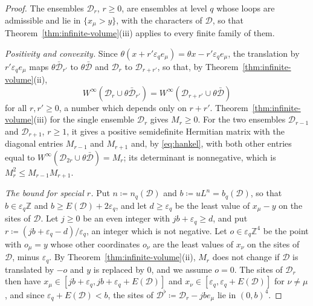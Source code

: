 \documentclass[11pt]{preprint}
\numberwithin{equation}{section}
\theoremstyle{definition}
\theoremstyle{remark}
\theoremstyle{plain}
\begin{document}
\begin{proof}
The ensembles $\mathcal D_r$, $r \geq 0$, are ensembles at level $q$ whose loops are admissible and lie in $\{ x_\mu > y \}$, with the characters of $\mathcal D$, so that Theorem~\ref{thm:infinite-volume}(iii) applies to every finite family of them.

\emph{Positivity and convexity.} Since $\theta(x + r'\varepsilon_qe_\mu) = \theta x - r'\varepsilon_qe_\mu$, the translation by $r'\varepsilon_qe_\mu$ maps $\theta\bar{\mathcal D}_{r'}$ to $\theta\bar{\mathcal D}$ and $\mathcal D_r$ to $\mathcal D_{r+r'}$, so that, by Theorem~\ref{thm:infinite-volume}(ii),
\begin{equation}\label{eq:hankel}
    W^\infty(\mathcal D_r \cup \theta\bar{\mathcal D}_{r'}) = W^\infty(\mathcal D_{r+r'} \cup \theta\bar{\mathcal D})
\end{equation}
for all $r, r' \geq 0$, a number which depends only on $r + r'$. Theorem~\ref{thm:infinite-volume}(iii) for the single ensemble $\mathcal D_r$ gives $M_r \geq 0$. For the two ensembles $\mathcal D_{r-1}$ and $\mathcal D_{r+1}$, $r \geq 1$, it gives a positive semidefinite Hermitian matrix with the diagonal entries $M_{r-1}$ and $M_{r+1}$ and, by \eqref{eq:hankel}, with both other entries equal to $W^\infty(\mathcal D_{2r} \cup \theta\bar{\mathcal D}) = M_r$; its determinant is nonnegative, which is $M_r^2 \leq M_{r-1}M_{r+1}$.

\emph{The bound for special $r$.} Put $n \coloneqq n_q(\mathcal D)$ and $b \coloneqq uL^n = b_q(\mathcal D)$, so that $b \in \varepsilon_q\mathbb Z$ and $b \geq E(\mathcal D) + 2\varepsilon_q$, and let $d \geq \varepsilon_q$ be the least value of $x_\mu - y$ on the sites of $\mathcal D$. Let $j \geq 0$ be an even integer with $jb + \varepsilon_q \geq d$, and put $r \coloneqq (jb + \varepsilon_q - d)/\varepsilon_q$, an integer which is not negative. Let $o \in \varepsilon_q\mathbb Z^4$ be the point with $o_\mu = y$ whose other coordinates $o_\nu$ are the least values of $x_\nu$ on the sites of $\mathcal D$, minus $\varepsilon_q$. By Theorem~\ref{thm:infinite-volume}(ii), $M_r$ does not change if $\mathcal D$ is translated by $-o$ and $y$ is replaced by $0$, and we assume $o = 0$. The sites of $\mathcal D_r$ then have $x_\mu \in [jb + \varepsilon_q, jb + \varepsilon_q + E(\mathcal D)]$ and $x_\nu \in [\varepsilon_q, \varepsilon_q + E(\mathcal D)]$ for $\nu \neq \mu$, and since $\varepsilon_q + E(\mathcal D) < b$, the sites of $\mathcal D^\flat \coloneqq \mathcal D_r - jbe_\mu$ lie in $(0, b)^4$.


\end{proof}
\end{document}
